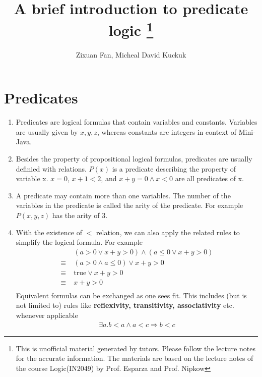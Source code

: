 \documentclass[12pt]{article}
\title{A brief introduction to predicate logic \footnote{This is unofficial material generated by tutors. 
Please follow the lecture notes for the accurate information. The materials are based on the lecture notes 
of the course Logic(IN2049) by Prof. Esparza and Prof. Nipkow}}
\author{Zixuan Fan, Micheal David Kuckuk}
\begin{document}
\maketitle

\section*{Predicates}
\begin{enumerate}
    \item Predicates are logical formulas that contain variables and constants. Variables are usually given by $x, y, z$, whereas constants are integers in context of Mini-Java.
    \item Besides the property of propositional logical formulas, predicates are usually definied with relations.
    $P(x)$ is a predicate describing the property of variable x. $x = 0$, $x + 1 < 2$, and $x + y = 0 \land x < 0$ are all 
    predicates of x.
    \item A predicate may contain more than one variables. The number of the variables in the predicate is
    called the arity of the predicate. For example $P(x, y, z)$ has the arity of 3.
    \item With the existence of $<$ relation, we can also apply the related rules to simplify the logical formula. For example
    \begin{align*}
        &\; (a > 0 \lor x + y > 0) \land (a \leq 0 \lor x + y > 0)\\
        \equiv& \; (a > 0 \land a \leq 0) \lor x + y > 0\\
        \equiv& \; \text{true} \lor x + y > 0\\
        \equiv& \; x + y > 0\\
    \end{align*}
    Equivalent formulas can be exchanged as one sees fit. This includes (but is not limited to) rules 
     like \textbf{reflexivity, transitivity, associativity} etc. whenever applicable
    \begin{align*}
        \exists a. b < a \land a < c \Longrightarrow b < c
    \end{align*}
\end{enumerate}
\end{document}
